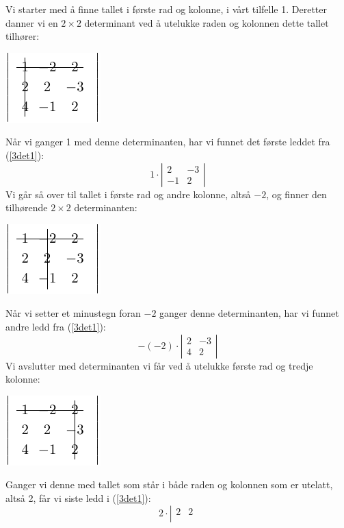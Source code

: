 {{		Vi starter med å finne tallet i første rad og kolonne, i vårt tilfelle 1. Deretter danner vi en $ {2\times 2}$ determinant ved å utelukke raden og kolonnen dette tallet tilhører:
		\begin{center}
			\includegraphics[]{fig/331}
		\end{center}
		Når vi ganger 1 med denne determinanten, har vi funnet det første leddet fra (\ref{3det1}):
		\[ 1\cdot\left|\begin{matrix}
		2 & -3  \\
		-1 & 2
		\end{matrix}\right| \]
		Vi går så over til tallet i første rad og andre kolonne, altså $ -2 $, og finner den tilhørende $ 2\times2 $ determinanten:
		\begin{center}
			\includegraphics[]{fig/332}
		\end{center}
		Når vi setter et minustegn foran $ -2 $ ganger denne determinanten, har vi funnet andre ledd fra (\ref{3det1}):
		\[ -(-2)\cdot\left|\begin{matrix}
		2 & -3  \\
		4 & 2
		\end{matrix}\right| \]
		Vi avslutter med determinanten vi får ved å utelukke første rad og tredje kolonne:
		\begin{center}
			\includegraphics[]{fig/333}
		\end{center}
		Ganger vi denne med tallet som står i både raden og kolonnen som er utelatt, altså 2, får vi siste ledd i (\ref{3det1}):
		\[ 2\cdot\left|\begin{matrix}
		2 & 2  \\

\end{matrix}\]}}

